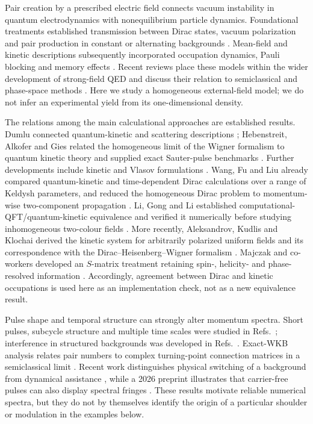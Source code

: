 \documentclass[11pt,a4paper]{article}
\begin{document}
Pair creation by a prescribed electric field connects vacuum instability in quantum electrodynamics with nonequilibrium particle dynamics. Foundational treatments established transmission between Dirac states, vacuum polarization and pair production in constant or alternating backgrounds \cite{EulerHeisenberg1936,Sauter1931,Schwinger1951,BrezinItzykson1970}. Mean-field and kinetic descriptions subsequently incorporated occupation dynamics, Pauli blocking and memory effects \cite{Kluger1991,Kluger1992,Kluger1998,Schmidt1998,Schmidt1999}. Recent reviews place these models within the wider development of strong-field QED and discuss their relation to semiclassical and phase-space methods \cite{Fedotov2023,Schubert2024}. Here we study a homogeneous external-field model; we do not infer an experimental yield from its one-dimensional density.

The relations among the main calculational approaches are established results. Dumlu connected quantum-kinetic and scattering descriptions \cite{Dumlu2009}; Hebenstreit, Alkofer and Gies related the homogeneous limit of the Wigner formalism to quantum kinetic theory and supplied exact Sauter-pulse benchmarks \cite{Hebenstreit2010}. Further developments include kinetic and Vlasov formulations \cite{Fedotov2011,KimSchubert2011,Huet2014}. Wang, Fu and Liu already compared quantum-kinetic and time-dependent Dirac calculations over a range of Keldysh parameters, and reduced the homogeneous Dirac problem to momentum-wise two-component propagation \cite{Wang2017}. Li, Gong and Li established computational-QFT/quantum-kinetic equivalence and verified it numerically before studying inhomogeneous two-colour fields \cite{LiGong2021}. More recently, Aleksandrov, Kudlis and Klochai derived the kinetic system for arbitrarily polarized uniform fields and its correspondence with the Dirac--Heisenberg--Wigner formalism \cite{Aleksandrov2024}. Majczak and co-workers developed an $S$-matrix treatment retaining spin-, helicity- and phase-resolved information \cite{Majczak2024}. Accordingly, agreement between Dirac and kinetic occupations is used here as an implementation check, not as a new equivalence result.

Pulse shape and temporal structure can strongly alter momentum spectra. Short pulses, subcycle structure and multiple time scales were studied in Refs.~\cite{Hebenstreit2008,Schutzhold2008,Hebenstreit2009}; interference in structured backgrounds was developed in Refs.~\cite{DumluDunne2010,DumluDunne2011a,DumluDunne2011b,Akkermans2012,Li2014}. Exact-WKB analysis relates pair numbers to complex turning-point connection matrices in a semiclassical limit \cite{Taya2021}. Recent work distinguishes physical switching of a background from dynamical assistance \cite{Aleksandrov2025}, while a 2026 preprint illustrates that carrier-free pulses can also display spectral fringes \cite{Aleksandrov2026}. These results motivate reliable numerical spectra, but they do not by themselves identify the origin of a particular shoulder or modulation in the examples below.
\end{document}
